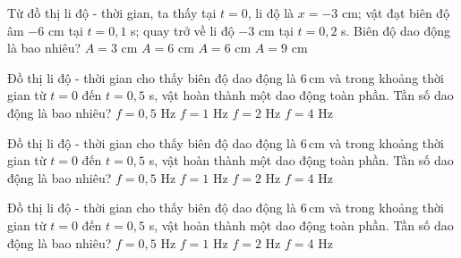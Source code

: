 \begin{ex}
Từ đồ thị li độ - thời gian, ta thấy tại $t = 0$, li độ là $x = -3$ cm; vật đạt biên độ âm $-6$ cm tại $t = 0{,}1$ s; quay trở về li độ $-3$ cm tại $t = 0{,}2$ s. Biên độ dao động là bao nhiêu?
\choice
{$A = 3$ cm}
{$A = 6$ cm}
{\True $A = 6$ cm}
{$A = 9$ cm}
\end{ex}

\begin{ex}
Đồ thị li độ - thời gian cho thấy biên độ dao động là $6\,\text{cm}$ và trong khoảng thời gian từ $t = 0$ đến $t = 0,5$ s, vật hoàn thành một dao động toàn phần. Tần số dao động là bao nhiêu?
\choice
{$f = 0{,}5$ Hz}
{$f = 1$ Hz}
{\True $f = 2$ Hz}
{$f = 4$ Hz}
\end{ex}

\begin{ex}
Đồ thị li độ - thời gian cho thấy biên độ dao động là $6\,\text{cm}$ và trong khoảng thời gian từ $t = 0$ đến $t = 0,5$ s, vật hoàn thành một dao động toàn phần. Tần số dao động là bao nhiêu?
\choice
{$f = 0{,}5$ Hz}
{$f = 1$ Hz}
{\True $f = 2$ Hz}
{$f = 4$ Hz}
\end{ex}

\begin{ex}
Đồ thị li độ - thời gian cho thấy biên độ dao động là $6\,\text{cm}$ và trong khoảng thời gian từ $t = 0$ đến $t = 0,5$ s, vật hoàn thành một dao động toàn phần. Tần số dao động là bao nhiêu?
\choice
{$f = 0{,}5$ Hz}
{$f = 1$ Hz}
{\True $f = 2$ Hz}
{$f = 4$ Hz}
\end{ex}

